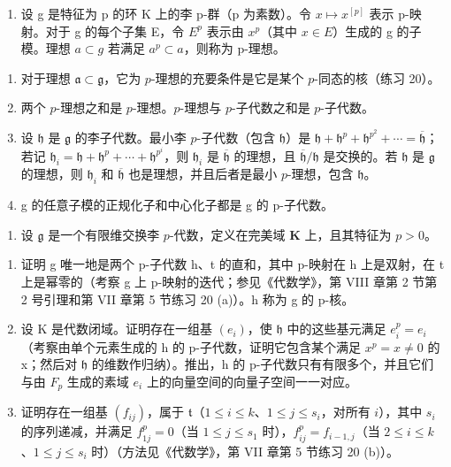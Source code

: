 \begin{enumerate}
\def\labelenumi{\arabic{enumi}.}
\setcounter{enumi}{21}
\tightlist
\item
  设 g 是特征为 p 的环 K 上的李 p-群（p 为素数）。令 \(x \mapsto x^{[p]}\) 表示 p-映射。对于 g 的每个子集 E，令 \(E^{p}\) 表示由 \(x^{p}\)（其中 \(x \in E\)）生成的 g 的子模。理想 \(a \subset g\) 若满足 \(a^{p} \subset a\)，则称为 p-理想。
\end{enumerate}

\begin{enumerate}
\def\labelenumi{(\alph{enumi})}
\item
对于理想 \(\mathfrak{a} \subset \mathfrak{g}\)，它为 \(p\)-理想的充要条件是它是某个 \(p\)-同态的核（练习 20）。
\item
两个 \(p\)-理想之和是 \(p\)-理想。\(p\)-理想与 \(p\)-子代数之和是 \(p\)-子代数。
\item
设 \(\mathfrak{h}\) 是 \(\mathfrak{g}\) 的李子代数。最小李 \(p\)-子代数（包含 \(\mathfrak{h}\)）是 \(\mathfrak{h} + \mathfrak{h}^p + \mathfrak{h}^{p^2} + \cdots = \overline{\mathfrak{h}}\)；若记 \(\mathfrak{h}_i = \mathfrak{h} + \mathfrak{h}^p + \cdots + \mathfrak{h}^{p^i}\)，则 \(\mathfrak{h}_i\) 是 \(\overline{\mathfrak{h}}\) 的理想，且 \(\overline{\mathfrak{h}}/\mathfrak{h}\) 是交换的。若 \(\mathfrak{h}\) 是 \(\mathfrak{g}\) 的理想，则 \(\mathfrak{h}_i\) 和 \(\overline{\mathfrak{h}}\) 也是理想，并且后者是最小 \(p\)-理想，包含 \(\mathfrak{h}\)。
\item
  g 的任意子模的正规化子和中心化子都是 g 的 p-子代数。
\end{enumerate}

\begin{enumerate}
\def\labelenumi{\arabic{enumi}.}
\setcounter{enumi}{22}
\tightlist
\item
设 \(\mathfrak{g}\) 是一个有限维交换李 \(p\)-代数，定义在完美域 \(\mathbf{K}\) 上，且其特征为 \(p > 0\)。
\end{enumerate}

\begin{enumerate}
\def\labelenumi{(\alph{enumi})}
\item
  证明 g 唯一地是两个 p-子代数 h、t 的直和，其中 p-映射在 h 上是双射，在 t 上是幂零的（考察 g 上 p-映射的迭代；参见《代数学》，第 VIII 章第 2 节第 2 号引理和第 VII 章第 5 节练习 20 (a)）。h 称为 g 的 p-核。
\item
  设 K 是代数闭域。证明存在一组基 \((e_{i})\)，使 \(\mathfrak{h}\) 中的这些基元满足 \(e_{i}^{p}=e_{i}\)（考察由单个元素生成的 h 的 p-子代数，证明它包含某个满足 \(x^{p}=x\neq0\) 的 x；然后对 \(\mathfrak{h}\) 的维数作归纳）。推出，h 的 p-子代数只有有限多个，并且它们与由 \(F_{p}\) 生成的素域 \(e_{i}\) 上的向量空间的向量子空间一一对应。
\item
证明存在一组基 \((f_{ij})\)，属于 \(\mathfrak{t}\)（\(1 \leqslant i \leqslant k\)、\(1 \leqslant j \leqslant s_i\)，对所有 \(i\)），其中 \(s_i\) 的序列递减，并满足 \(f_{1j}^p = 0\)（当 \(1 \leqslant j \leqslant s_1\) 时），\(f_{ij}^p = f_{i-1,j}\)（当 \(2 \leqslant i \leqslant k\)、\(1 \leqslant j \leqslant s_i\) 时）（方法见《代数学》，第 VII 章第 5 节练习 20 (b)）。
\end{enumerate}

